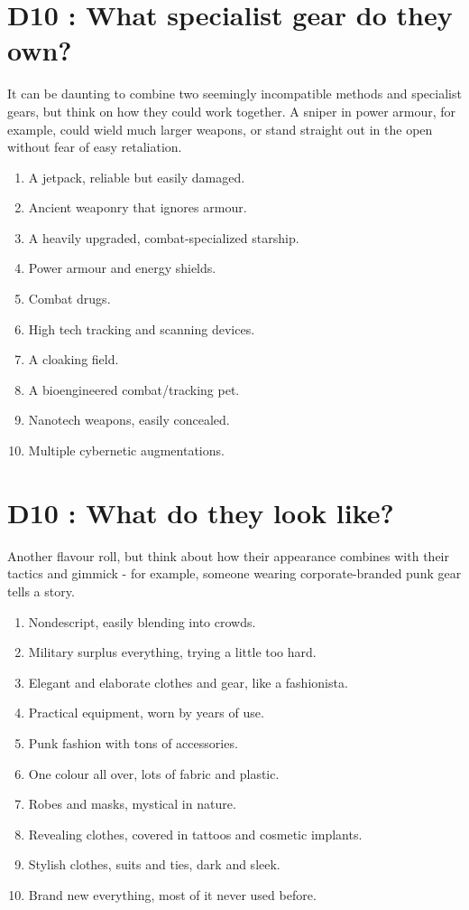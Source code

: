 \documentclass{article}
\begin{document}
\section*{D10 : What specialist gear do they own?}
It can be daunting to combine two seemingly incompatible methods and specialist gears, but think on how they could work together. A sniper in power armour, for example, could wield much larger weapons, or stand straight out in the open without fear of easy retaliation.
\begin{enumerate}
	\item A jetpack, reliable but easily damaged.
	\item Ancient weaponry that ignores armour.
	\item A heavily upgraded, combat-specialized starship.
	\item Power armour and energy shields.
	\item Combat drugs.
	\item High tech tracking and scanning devices.
	\item A cloaking field.
	\item A bioengineered combat/tracking pet.
	\item Nanotech weapons, easily concealed.
	\item Multiple cybernetic augmentations.
\end{enumerate}

\section*{D10 : What do they look like?}
Another flavour roll, but think about how their appearance combines with their tactics and gimmick - for example, someone wearing corporate-branded punk gear tells a story.
\begin{enumerate}
	\item Nondescript, easily blending into crowds.
	\item Military surplus everything, trying a little too hard.
	\item Elegant and elaborate clothes and gear, like a fashionista.
	\item Practical equipment, worn by years of use.
	\item Punk fashion with tons of accessories.
	\item One colour all over, lots of fabric and plastic.
	\item Robes and masks, mystical in nature.
	\item Revealing clothes, covered in tattoos and cosmetic implants.
	\item Stylish clothes, suits and ties, dark and sleek.
	\item Brand new everything, most of it never used before.
\end{enumerate}
\end{document}
